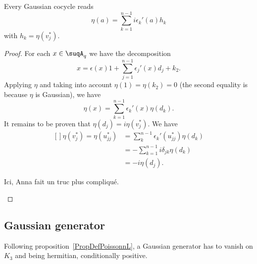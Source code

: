 \begin{proposition}     \label{PropGaussCocycle}
	Every Gaussian cocycle reads
	\begin{equation}
		\eta(a)=\sum_{k=1}^{n-1}i\epsilon_k'(a)h_k
	\end{equation}
	with $h_k=\eta(v_j^*)$.
\end{proposition}

\begin{proof}
	For each $x\in\suqA_q$ we have the decomposition
	\begin{equation}
		x=\epsilon(x)1+\sum_{j=1}^{n-1}\epsilon_j'(x)d_j+k_2.
	\end{equation}
	Applying $\eta$ and taking into account $\eta(1)=\eta(k_2)=0$ (the second equality is because $\eta$ is Gaussian), we have
	\begin{equation}
		\eta(x)=\sum_{k=1}^{n-1}\epsilon_k'(x)\eta(d_k).
	\end{equation}
	It remains to be proven that $\eta(d_j)=i\eta(v_j^*)$. We have
	\begin{equation}
		\begin{aligned}[]
			\eta(v_j^*)=\eta(u_{jj}^*) & =\sum_k^{n-1}\epsilon_k'(u_{jj}^*)\eta(d_k) \\
			                           & =-\sum_{k=1}^{n-1}i\delta_{jk}\eta(d_k)     \\
			                           & =-i\eta(d_j).
		\end{aligned}
	\end{equation}
	\begin{probleme}
		Ici, Anna fait un truc plus compliqué.
	\end{probleme}

\end{proof}

\subsection{Gaussian generator}

Following proposition~\ref{PropDefPoissonnL}, a Gaussian generator has to vanish on $K_3$ and being hermitian, conditionally positive.

